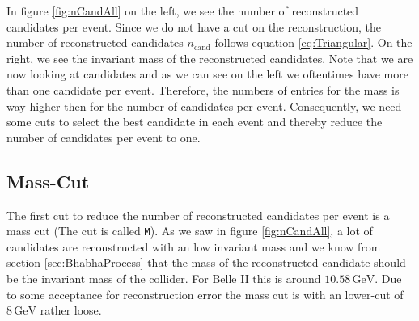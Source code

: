 \documentclass[a4paper,11pt,twosided,final,german,openbib,pdftex,listof=totoc,bibliography=totoc]{scrbook}
\begin{document}
In figure \ref{fig:nCandAll} on the left, we see the number of reconstructed candidates per event. Since we do not have a cut on the reconstruction, the number of reconstructed candidates $n_{\textrm{cand}}$ follows equation \ref{eq:Triangular}. On the right, we see the invariant mass of the reconstructed candidates. Note that we are now looking at candidates and as we can see on the left we oftentimes have more than one candidate per event. Therefore, the numbers of entries for the mass is way higher then for the number of candidates per event.
Consequently, we need some cuts to select the best candidate in each event and thereby reduce the number of candidates per event to one.


\subsection{Mass-Cut}

The first cut to reduce the number of reconstructed candidates per event is a mass cut (The cut is called \texttt{M}). As we saw in figure \ref{fig:nCandAll}, a lot of candidates are reconstructed with an low invariant mass and we know from section \ref{sec:BhabhaProcess} that the mass of the reconstructed candidate should be the invariant mass of the collider. For Belle II this is around $10.58\,\textrm{GeV}$. Due to some acceptance for reconstruction error the mass cut is with an lower-cut of $8\,\textrm{GeV}$ rather loose.
\end{document}
